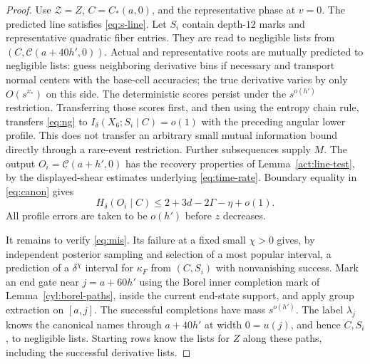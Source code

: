 \begin{proof}
Use $\mathscr Z=Z$, $C=C_*(a,0)$, and the representative phase at
$v=0$.  The predicted line satisfies \eqref{eq:s-line}.  Let $S_i$
contain depth-$12$ marks and representative quadratic fiber entries.
They are read to negligible lists from
$(C,\mathcal C(a+40h',0))$.  Actual and representative roots are
mutually predicted to negligible lists: guess neighboring derivative
bins if necessary and transport normal centers with the base-cell
accuracies; the true derivative varies by only $O(s^{x_*})$ on
this side.  The deterministic scores persist under the
$s^{o(h')}$ restriction.  Transferring those scores first, and then
using the entropy chain rule, transfers \eqref{eq:ng} to
$I_\delta(X_6;S_i\mid C)=o(1)$ with the preceding angular lower
profile.  This does not transfer an arbitrary small mutual
information bound directly through a rare-event restriction.
Further subsequences supply $M$.  The output
$O_i=\mathcal C(a+h',0)$ has the recovery properties of
Lemma~\ref{act:line-test}, by the displayed-shear estimates underlying
\eqref{eq:time-rate}.  Boundary equality in \eqref{eq:canon} gives
\[
 H_\delta(O_i\mid C)\le2+3d-2\Gamma-\eta+o(1).
\]
All profile errors are taken to be $o(h')$ before $z$ decreases.

It remains to verify \eqref{eq:mis}.  Its failure at a fixed small
$\chi>0$ gives, by independent posterior sampling and selection of
a most popular interval, a prediction of a $\delta^\chi$ interval
for $\kappa_F$ from $(C,S_i)$ with nonvanishing success.  Mark an
end gate near $j=a+60h'$ using the Borel inner completion mark of
Lemma~\ref{cyl:borel-paths}, inside the current end-state support,
and apply group extraction on $[a,j]$.
The successful completions have mass $s^{o(h')}$.  The label
$\lambda_j$ knows the canonical names through $a+40h'$ at width
$0=u(j)$, and hence $C,S_i$, to negligible lists.  Starting rows
know the lists for $Z$ along these paths, including the successful
derivative lists.


\end{proof}
